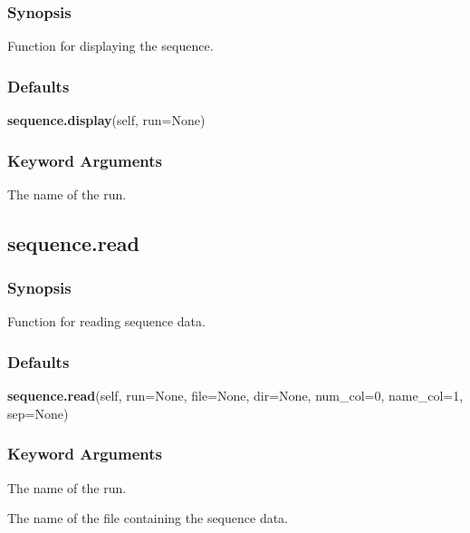   
 \subsubsection{Synopsis} 

 Function for displaying the sequence. 
  

  
 \subsubsection{Defaults} 

 \textsf{\textbf{sequence.display}(self, run=None)} 

  
 \subsubsection{Keyword Arguments} 

   The name of the run.  

  

  

 \newpage 

 \subsection{sequence.read} 

  
 \subsubsection{Synopsis} 

 Function for reading sequence data. 
  

  
 \subsubsection{Defaults} 

 \textsf{\textbf{sequence.read}(self, run=None, file=None, dir=None, num\_col=0, name\_col=1, sep=None)} 

  
 \subsubsection{Keyword Arguments} 

   The name of the run.   

   The name of the file containing the sequence data.   

